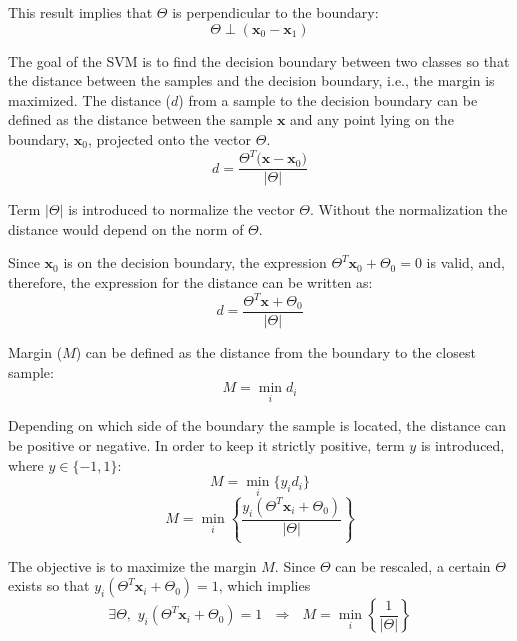 \noindent This result implies that $\Theta$ is perpendicular to the boundary:
\begin{equation} 
\Theta \perp \left(\mathbf{x}_0 - \mathbf{x}_1\right)
\end{equation}


The goal of the SVM is to find the decision boundary between two classes so that the distance between the samples and the decision boundary, i.e., the margin is maximized. The distance ($d$) from a sample to the decision boundary can be defined as the distance between the sample $\mathbf{x}$ and any point lying on the boundary, $\mathbf{x}_0$, projected onto the vector $\Theta$.
\begin{equation} 
d = \frac{\Theta^T \big(\mathbf{x} - \mathbf{x}_0\big)}{\big\vert \Theta \big\vert}
\end{equation}

\noindent Term $\vert \Theta \vert$ is introduced to normalize the vector $\Theta$. Without the normalization the distance would depend on the norm of $\Theta$.

Since $\mathbf{x}_0$ is on the decision boundary, the expression $\Theta^T \mathbf{x}_0 + \Theta_0 = 0$ is valid, and, therefore, the expression for the distance can be written as:
\begin{equation} 
d = \frac{\Theta^T \mathbf{x} + \Theta_0}{\big\vert \Theta \big\vert}
\end{equation}

Margin ($M$) can be defined as the distance from the boundary to the closest sample:
\begin{equation} 
M = \min_i d_i
\end{equation}

Depending on which side of the boundary the sample is located, the distance can be positive or negative. In order to keep it strictly positive, term $y$ is introduced, where $y \in \{-1,1\}$:
\begin{equation} 
M = \min_i \big\{y_id_i\big\}
\end{equation}
\begin{equation} 
M = \min_i \left\{ \frac{y_i \left(\Theta^T \mathbf{x}_i + \Theta_0\right)}{\left\vert \Theta \right\vert} \right\}
\end{equation}

The objective is to maximize the margin $M$. Since $\Theta$ can be rescaled, a certain $\Theta$ exists so that $y_i \left(\Theta^T \mathbf{x}_i + \Theta_0\right) = 1$, which implies
\begin{equation} 
\exists \Theta, \,\, y_i \left(\Theta^T \mathbf{x}_i + \Theta_0\right) = 1 \,\,\,\, \Rightarrow \,\,\,\, M = \min_i \left\{ \frac{1}{\left\vert \Theta \right\vert} \right\}
\end{equation}

